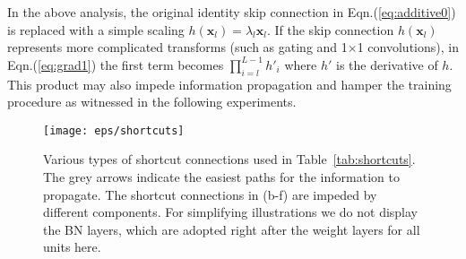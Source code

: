 \documentclass[runningheads]{llncs}
\newcommand{\ve}[1]{\mathbf{#1}} \newcommand{\ma}[1]{\mathrm{#1}}
\begin{document}
In the above analysis, the original identity skip connection in Eqn.(\ref{eq:additive0}) is replaced with a simple scaling $h(\ve{x}_{l}) = \lambda_l\ve{x}_{l}$. If the skip connection $h(\ve{x}_{l})$ represents more complicated transforms (such as gating and 1$\times$1 convolutions), in Eqn.(\ref{eq:grad1}) the first term becomes $\prod_{i=l}^{L-1}h'_{i}$ where $h'$ is the derivative of $h$. This product may also impede information propagation and hamper the training procedure as witnessed in the following experiments.

\begin{figure}[t]
\centering
\texttt{[image: eps/shortcuts]}
\caption{Various types of shortcut connections used in Table~\ref{tab:shortcuts}. The grey arrows indicate the easiest paths for the information to propagate. The shortcut connections in (b-f) are impeded by different components. For simplifying illustrations we do not display the BN layers, which are adopted right after the weight layers for all units here.}
\label{fig:shortcuts}
\end{figure}
\end{document}
